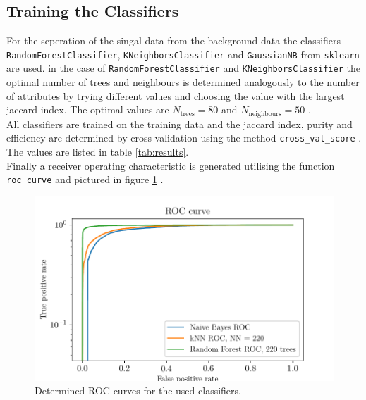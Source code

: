 \subsection{Training the Classifiers}

For the seperation of the singal data from the background data the classifiers \\ 
\texttt{RandomForestClassifier}, \texttt{KNeighborsClassifier}
and \texttt{GaussianNB} from \texttt{sklearn} are used. in the case of \texttt{RandomForestClassifier} and  \texttt{KNeighborsClassifier}
the optimal number of trees and neighbours is determined analogously to the number of attributes by trying different values and choosing
the value with the largest jaccard index. The optimal values are $N_\text{trees} = 80$ and $N_\text{neighbours} = 50$ \cite{scikit-learn}.\\
All classifiers are trained on the training data and the jaccard index, purity and efficiency are determined by cross validation using 
the method \texttt{cross\_val\_score} \cite{scikit-learn}.
The values are listed in table \ref{tab:results}. \\
Finally a receiver operating characteristic is generated utilising the function \texttt{roc\_curve} and pictured in figure \ref{fig:ROC} \cite{scikit-learn}.

\begin{figure}[tb]
  \centering
  \includegraphics[width=12cm,keepaspectratio]{plots/ROC.pdf}
  \caption{Determined ROC curves for the used classifiers.}
  \label{fig:ROC}
\end{figure}


